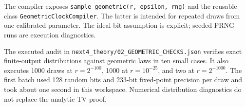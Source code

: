 The compiler exposes
\texttt{sample\_geometric(r, epsilon, rng)} and the reusable class
\texttt{GeometricClockCompiler}. The latter is intended for repeated
draws from one calibrated parameter. The ideal-bit assumption is
explicit; seeded PRNG runs are execution diagnostics.

The executed audit in \texttt{next4\_theory/02\_GEOMETRIC\_CHECKS.json}
verifies exact finite-output distributions against geometric laws in
ten small cases. It also executes 1000 draws at $r=2^{-100}$, 1000 at
$r=10^{-25}$, and two at $r=2^{-1000}$. The first batch used 128 random
bits and 233-bit fixed-point precision per draw and took about one
second in this workspace. Numerical distribution diagnostics do not
replace the analytic TV proof.
